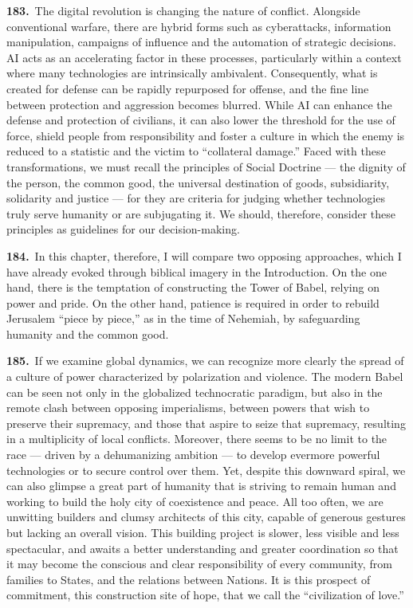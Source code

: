 \documentclass{article}
\begin{document}
\textbf{183.}\ The digital revolution is changing the nature of conflict. Alongside conventional warfare, there are hybrid forms such as cyberattacks, information manipulation, campaigns of influence and the automation of strategic decisions. AI acts as an accelerating factor in these processes, particularly within a context where many technologies are intrinsically ambivalent. Consequently, what is created for defense can be rapidly repurposed for offense, and the fine line between protection and aggression becomes blurred. While AI can enhance the defense and protection of civilians, it can also lower the threshold for the use of force, shield people from responsibility and foster a culture in which the enemy is reduced to a statistic and the victim to ``collateral damage.'' Faced with these transformations, we must recall the principles of Social Doctrine --- the dignity of the person, the common good, the universal destination of goods, subsidiarity, solidarity and justice --- for they are criteria for judging whether technologies truly serve humanity or are subjugating it. We should, therefore, consider these principles as guidelines for our decision-making.

\textbf{184.}\ In this chapter, therefore, I will compare two opposing approaches, which I have already evoked through biblical imagery in the Introduction. On the one hand, there is the temptation of constructing the Tower of Babel, relying on power and pride. On the other hand, patience is required in order to rebuild Jerusalem ``piece by piece,'' as in the time of Nehemiah, by safeguarding humanity and the common good.

\textbf{185.}\ If we examine global dynamics, we can recognize more clearly the spread of a culture of power characterized by polarization and violence. The modern Babel can be seen not only in the globalized technocratic paradigm, but also in the remote clash between opposing imperialisms, between powers that wish to preserve their supremacy, and those that aspire to seize that supremacy, resulting in a multiplicity of local conflicts. Moreover, there seems to be no limit to the race --- driven by a dehumanizing ambition --- to develop evermore powerful technologies or to secure control over them. Yet, despite this downward spiral, we can also glimpse a great part of humanity that is striving to remain human and working to build the holy city of coexistence and peace. All too often, we are unwitting builders and clumsy architects of this city, capable of generous gestures but lacking an overall vision. This building project is slower, less visible and less spectacular, and awaits a better understanding and greater coordination so that it may become the conscious and clear responsibility of every community, from families to States, and the relations between Nations. It is this prospect of commitment, this construction site of hope, that we call the ``civilization of love.''
\end{document}

